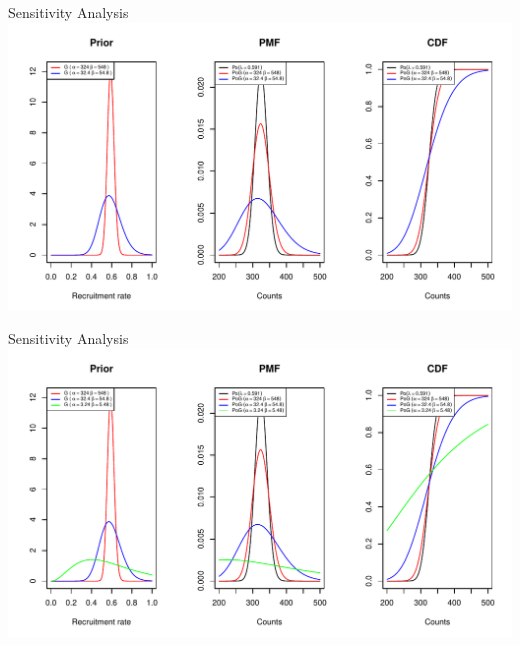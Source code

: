 \documentclass[english]{beamer}\usepackage[]{graphicx}\usepackage[]{xcolor}
\makeatletter
\def\maxwidth{ %
  \ifdim\Gin@nat@width>\linewidth
    \linewidth
  \else
    \Gin@nat@width
  \fi
}
\newenvironment{knitrout}{}{} %
\makeatother
\begin{document}
\begin{frame}{Sensitivity Analysis}
\begin{knitrout}
\color{fgcolor}
\includegraphics[width=\maxwidth]{figures/figunnamed-chunk-12-1} 
\end{knitrout}

\end{frame}



\begin{frame}{Sensitivity Analysis}
\begin{knitrout}
\color{fgcolor}
\includegraphics[width=\maxwidth]{figures/figunnamed-chunk-13-1} 
\end{knitrout}

\end{frame}
\end{document}
